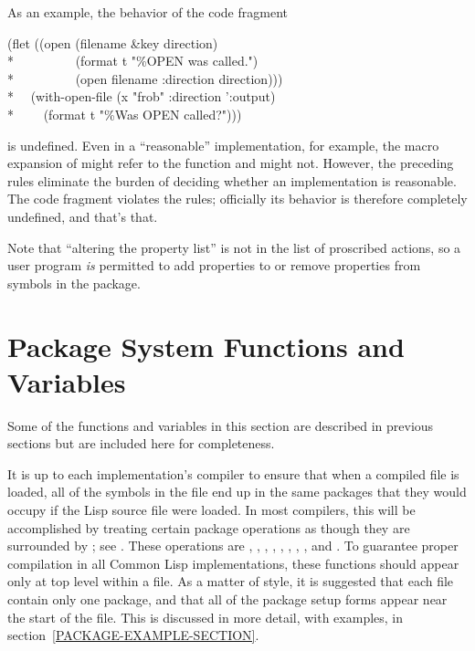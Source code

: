 \begin{newer}
As an example, the behavior of the code fragment
\begin{lisp}
(flet ((open (filename \&key direction) \\*
~~~~~~~~~(format t "{\Xtilde}\%OPEN was called.")  \\*
~~~~~~~~~(open filename :direction direction))) \\*
~~(with-open-file (x "frob" :direction ':output)  \\*
~~~~(format t "{\Xtilde}\%Was OPEN called?")))
\end{lisp}
is undefined.  Even in a ``reasonable'' implementation,
for example, the macro expansion of  might refer
to the  function and might not.  However, the preceding rules eliminate
the burden of deciding whether an implementation is reasonable. The code
fragment violates the rules; officially its behavior is therefore
completely undefined, and that's that.

Note that ``altering the property list'' is not in the list of
proscribed actions, so a user program {\it is} permitted to
add properties to or remove properties from
symbols in the  package.
\end{newer}

\section{Package System Functions and Variables}
\label{PACKAGE-FUNCTIONS-SECTION}

Some of the functions and variables in this section
are described in previous sections but are included here
for completeness.

\begin{obsolete}
It is up to each implementation's compiler to ensure that when a
compiled file is loaded, all of the symbols in the file end up in the
same packages that they would occupy if the Lisp source file were
loaded.  In most compilers, this will be accomplished by treating
certain package operations as though they are surrounded by
; see .
These operations are
, , , ,
, , , , and .
To guarantee proper compilation in all Common Lisp
implementations, these functions should appear only at top level within
a file.  As a matter of style, it is suggested that each file contain
only one package, and that all of the package setup forms appear near
the start of the file.  This is discussed in more detail, with examples,
in section~\ref{PACKAGE-EXAMPLE-SECTION}.
\end{obsolete}

